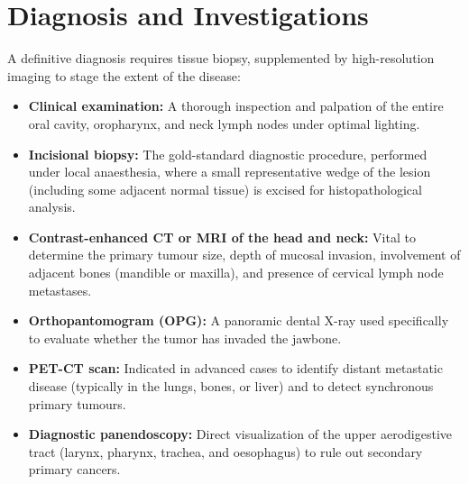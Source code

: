 \section*{Diagnosis and Investigations}
A definitive diagnosis requires tissue biopsy, supplemented by high-resolution imaging to stage the extent of the disease:
\begin{itemize}
    \item \textbf{Clinical examination:} A thorough inspection and palpation of the entire oral cavity, oropharynx, and neck lymph nodes under optimal lighting.
    \item \textbf{Incisional biopsy:} The gold-standard diagnostic procedure, performed under local anaesthesia, where a small representative wedge of the lesion (including some adjacent normal tissue) is excised for histopathological analysis.
    \item \textbf{Contrast-enhanced CT or MRI of the head and neck:} Vital to determine the primary tumour size, depth of mucosal invasion, involvement of adjacent bones (mandible or maxilla), and presence of cervical lymph node metastases.
    \item \textbf{Orthopantomogram (OPG):} A panoramic dental X-ray used specifically to evaluate whether the tumor has invaded the jawbone.
    \item \textbf{PET-CT scan:} Indicated in advanced cases to identify distant metastatic disease (typically in the lungs, bones, or liver) and to detect synchronous primary tumours.
    \item \textbf{Diagnostic panendoscopy:} Direct visualization of the upper aerodigestive tract (larynx, pharynx, trachea, and oesophagus) to rule out secondary primary cancers.
\end{itemize}

